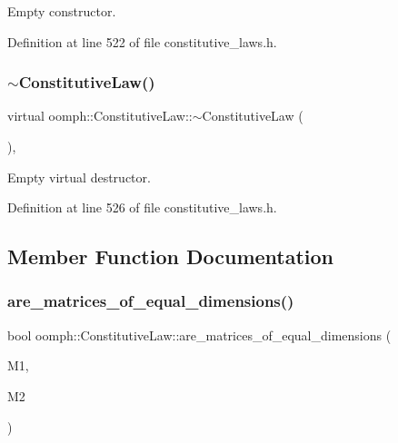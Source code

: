Empty constructor. 



Definition at line 522 of file constitutive\+\_\+laws.\+h.

\mbox{\label{classoomph_1_1ConstitutiveLaw_aa75b88c826723ba090ace39c26da0ae6}} 
\subsubsection{\texorpdfstring{$\sim$\+Constitutive\+Law()}{~ConstitutiveLaw()}}
{\footnotesize\ttfamily virtual oomph\+::\+Constitutive\+Law\+::$\sim$\+Constitutive\+Law (\begin{DoxyParamCaption}{ }\end{DoxyParamCaption})\hspace{0.3cm}{\ttfamily [inline]}, {\ttfamily [virtual]}}



Empty virtual destructor. 



Definition at line 526 of file constitutive\+\_\+laws.\+h.



\subsection{Member Function Documentation}
\mbox{\label{classoomph_1_1ConstitutiveLaw_a8a89bb96a9b922294509923563a13063}} 
\subsubsection{\texorpdfstring{are\+\_\+matrices\+\_\+of\+\_\+equal\+\_\+dimensions()}{are\_matrices\_of\_equal\_dimensions()}}
{\footnotesize\ttfamily bool oomph\+::\+Constitutive\+Law\+::are\+\_\+matrices\+\_\+of\+\_\+equal\+\_\+dimensions (\begin{DoxyParamCaption}\item[{const \hyperlink{classoomph_1_1DenseMatrix}{Dense\+Matrix}$<$ double $>$ \&}]{M1,  }\item[{const \hyperlink{classoomph_1_1DenseMatrix}{Dense\+Matrix}$<$ double $>$ \&}]{M2 }\end{DoxyParamCaption})\hspace{0.3cm}{\ttfamily [protected]}}



